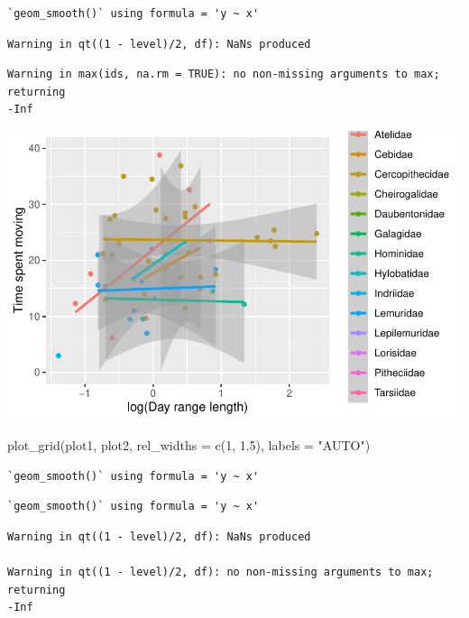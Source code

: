 \documentclass[
  letterpaper,
  DIV=11,
  numbers=noendperiod]{scrartcl}
\newenvironment{Shaded}{\begin{snugshade}}{\end{snugshade}}
\newcommand{\AttributeTok}[1]{\textcolor[rgb]{0.40,0.45,0.13}{#1}}
\newcommand{\DecValTok}[1]{\textcolor[rgb]{0.68,0.00,0.00}{#1}}
\newcommand{\FloatTok}[1]{\textcolor[rgb]{0.68,0.00,0.00}{#1}}
\newcommand{\FunctionTok}[1]{\textcolor[rgb]{0.28,0.35,0.67}{#1}}
\newcommand{\NormalTok}[1]{\textcolor[rgb]{0.00,0.23,0.31}{#1}}
\newcommand{\StringTok}[1]{\textcolor[rgb]{0.13,0.47,0.30}{#1}}
\begin{document}
\begin{verbatim}
`geom_smooth()` using formula = 'y ~ x'
\end{verbatim}

\begin{verbatim}
Warning in qt((1 - level)/2, df): NaNs produced
\end{verbatim}

\begin{verbatim}
Warning in max(ids, na.rm = TRUE): no non-missing arguments to max; returning
-Inf
\end{verbatim}

\includegraphics{EDA-challenge_files/figure-pdf/unnamed-chunk-3-2.pdf}

\begin{Shaded}
\begin{Highlighting}[]
\FunctionTok{plot\_grid}\NormalTok{(plot1, plot2, }\AttributeTok{rel\_widths =} \FunctionTok{c}\NormalTok{(}\DecValTok{1}\NormalTok{, }\FloatTok{1.5}\NormalTok{), }\AttributeTok{labels =} \StringTok{"AUTO"}\NormalTok{)}
\end{Highlighting}
\end{Shaded}

\begin{verbatim}
`geom_smooth()` using formula = 'y ~ x'
\end{verbatim}

\begin{verbatim}
`geom_smooth()` using formula = 'y ~ x'
\end{verbatim}

\begin{verbatim}
Warning in qt((1 - level)/2, df): NaNs produced

Warning in qt((1 - level)/2, df): no non-missing arguments to max; returning
-Inf
\end{verbatim}
\end{document}
